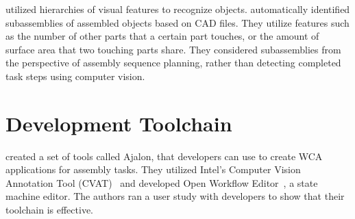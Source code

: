\citet{semantic_hierarchy} utilized hierarchies of visual features to recognize
objects.
\citet{subassembly_identification} automatically identified subassemblies of
assembled objects based on CAD files.
They utilize features such as the number of other parts that a certain part
touches, or the amount of surface area that two touching parts share.
They considered subassemblies from the perspective of assembly sequence
planning, rather than detecting completed task steps using computer vision.

\section{Development Toolchain}

\citet{pham2021ajalon} created a set of tools called Ajalon, that developers can
use to create WCA applications for assembly tasks.
They utilized Intel's Computer Vision Annotation Tool (CVAT)~{\cite{CVAT}} and
developed Open Workflow Editor~{\cite{workflow}}, a state machine editor.
The authors ran a user study with developers to show that their toolchain is
effective.
